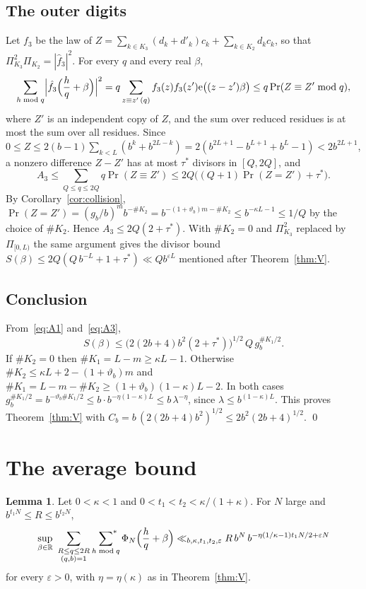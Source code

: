\documentclass[11pt]{amsart}
\theoremstyle{definition}
\newtheorem{lemma}[theorem]{Lemma}
\numberwithin{equation}{section}
\newcommand{\e}{\mathrm{e}}
\newcommand{\R}{\mathbb{R}}
\newcommand{\sumstar}{\sideset{}{^*}\sum}
\begin{document}
\subsection{The outer digits}
Let $f_3$ be the law of $Z=\sum_{k\in K_3}(d_k+d'_k)c_k+\sum_{k\in K_2}d_kc_k$, so that $\Pi_{K_3}^2\Pi_{K_2}=|\hat f_3|^2$. For every $q$ and every real $\beta$,
\[
\sum_{h\bmod q}\Bigl|\hat f_3\Bigl(\frac hq+\beta\Bigr)\Bigr|^2=q\sum_{z\equiv z'\,(q)}f_3(z)f_3(z')\e\bigl((z-z')\beta\bigr)\le q\Pr(Z\equiv Z'\bmod q),
\]
where $Z'$ is an independent copy of $Z$, and the sum over reduced residues is at most the sum over all residues. Since $0\le Z\le2(b-1)\sum_{k<L}(b^k+b^{2L-k})=2(b^{2L+1}-b^{L+1}+b^L-1)<2b^{2L+1}$, a nonzero difference $Z-Z'$ has at most $\tau^*$ divisors in $[Q,2Q]$, and
\begin{equation}\label{eq:A3}
A_3\le\sum_{Q\le q\le2Q}q\Pr(Z\equiv Z')\le 2Q\bigl((Q+1)\Pr(Z=Z')+\tau^*\bigr).
\end{equation}
By Corollary~\ref{cor:collision}, $\Pr(Z=Z')=(g_b/b)^mb^{-\#K_2}=b^{-(1+\vartheta_b)m-\#K_2}\le b^{-\kappa L-1}\le 1/Q$ by the choice of $\#K_2$. Hence $A_3\le2Q(2+\tau^*)$. With $\#K_2=0$ and $\Pi_{K_3}^2$ replaced by $\Pi_{[0,L)}$ the same argument gives the divisor bound $S(\beta)\le 2Q(Q\,b^{-L}+1+\tau^*)\ll Qb^{\varepsilon L}$ mentioned after Theorem~\ref{thm:V}.

\subsection{Conclusion}
From~\eqref{eq:A1} and~\eqref{eq:A3},
\[
S(\beta)\le\bigl(2(2b+4)b^2(2+\tau^*)\bigr)^{1/2}\,Q\,g_b^{\#K_1/2}.
\]
If $\#K_2=0$ then $\#K_1=L-m\ge\kappa L-1$. Otherwise $\#K_2\le\kappa L+2-(1+\vartheta_b)m$ and $\#K_1=L-m-\#K_2\ge(1+\vartheta_b)(1-\kappa)L-2$. In both cases $g_b^{\#K_1/2}=b^{-\vartheta_b\#K_1/2}\le b\cdot b^{-\eta(1-\kappa)L}\le b\,\lambda^{-\eta}$, since $\lambda\le b^{(1-\kappa)L}$. This proves Theorem~\ref{thm:V} with $C_b=b\,(2(2b+4)b^2)^{1/2}\le 2b^2(2b+4)^{1/2}$. \qed

\section{The average bound}\label{sec:average}

\begin{lemma}\label{lem:window}
Let $0<\kappa<1$ and $0<t_1<t_2<\kappa/(1+\kappa)$. For $N$ large and $b^{t_1N}\le R\le b^{t_2N}$,
\[
\sup_{\beta\in\R}\ \sum_{\substack{R\le q\le2R\\(q,b)=1}}\ \sumstar_{h\bmod q}\Phi_N\Bigl(\frac hq+\beta\Bigr)\ll_{b,\kappa,t_1,t_2,\varepsilon}R\,b^{N}\,b^{-\eta(1/\kappa-1)t_1N/2+\varepsilon N}
\]
for every $\varepsilon>0$, with $\eta=\eta(\kappa)$ as in Theorem~\ref{thm:V}.
\end{lemma}
\end{document}

